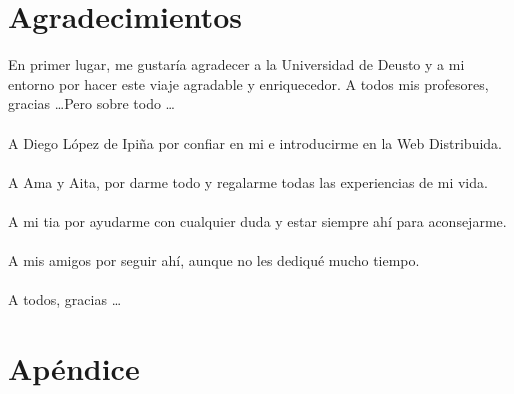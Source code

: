 \documentclass[a4paper,openright,11pt]{book}
\begin{document}
\chapter{Agradecimientos}
En primer lugar, me gustaría agradecer a la Universidad de Deusto y a mi entorno por hacer este viaje agradable y enriquecedor. A todos mis profesores, gracias \dots Pero sobre todo \dots \\
\\
A Diego López de Ipiña por confiar en mi e introducirme en la Web Distribuida.\\
\\
A Ama y Aita, por darme todo y regalarme todas las experiencias de mi vida.\\
\\
A mi tia por ayudarme con cualquier duda y estar siempre ahí para aconsejarme.\\
\\
A mis amigos por seguir ahí, aunque no les dediqué mucho tiempo.\\
\\
A todos, gracias \dots
\newpage
\chapter{Apéndice}
\end{document}
